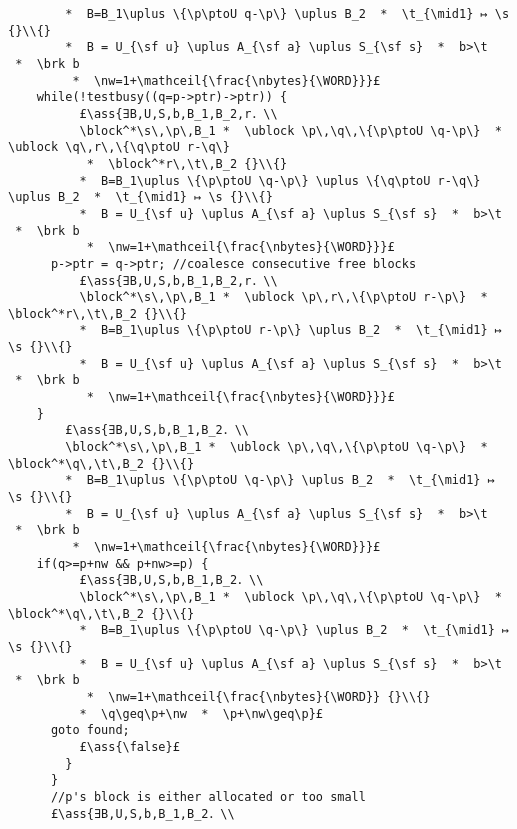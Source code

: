 \documentclass[12pt,a4paper]{article}
\makeatletter
\newcommand{\ml}[2][t]{\mbox{\mdseries\begin{tabular}[#1]{@{}L@{}}#2\end{tabular}}}
\newcommand{\ass}[1]{\ensuremath{{\color{blue}\left\{\ml[c]{#1}\right\}}}}
\makeatother
\begin{document}
\begin{lstlisting}
        *  B=B_1\uplus \{\p\ptoU q-\p\} \uplus B_2  *  \t_{\mid1} ↦ \s {}\\{}
        *  B = U_{\sf u} \uplus A_{\sf a} \uplus S_{\sf s}  *  b>\t  *  \brk b 
         *  \nw=1+\mathceil{\frac{\nbytes}{\WORD}}}£ 
	while(!testbusy((q=p->ptr)->ptr)) {
          £\ass{∃B,U,S,b,B_1,B_2,r．\\
          \block^*\s\,\p\,B_1 *  \ublock \p\,\q\,\{\p\ptoU \q-\p\}  *  \ublock \q\,r\,\{\q\ptoU r-\q\} 
           *  \block^*r\,\t\,B_2 {}\\{}
          *  B=B_1\uplus \{\p\ptoU \q-\p\} \uplus \{\q\ptoU r-\q\} \uplus B_2  *  \t_{\mid1} ↦ \s {}\\{}
          *  B = U_{\sf u} \uplus A_{\sf a} \uplus S_{\sf s}  *  b>\t  *  \brk b 
           *  \nw=1+\mathceil{\frac{\nbytes}{\WORD}}}£ 
	  p->ptr = q->ptr; //coalesce consecutive free blocks
          £\ass{∃B,U,S,b,B_1,B_2,r．\\
          \block^*\s\,\p\,B_1 *  \ublock \p\,r\,\{\p\ptoU r-\p\}  *  \block^*r\,\t\,B_2 {}\\{}
          *  B=B_1\uplus \{\p\ptoU r-\p\} \uplus B_2  *  \t_{\mid1} ↦ \s {}\\{}
          *  B = U_{\sf u} \uplus A_{\sf a} \uplus S_{\sf s}  *  b>\t  *  \brk b 
           *  \nw=1+\mathceil{\frac{\nbytes}{\WORD}}}£
	}
        £\ass{∃B,U,S,b,B_1,B_2．\\
        \block^*\s\,\p\,B_1 *  \ublock \p\,\q\,\{\p\ptoU \q-\p\}  *  \block^*\q\,\t\,B_2 {}\\{}
        *  B=B_1\uplus \{\p\ptoU \q-\p\} \uplus B_2  *  \t_{\mid1} ↦ \s {}\\{}
        *  B = U_{\sf u} \uplus A_{\sf a} \uplus S_{\sf s}  *  b>\t  *  \brk b 
         *  \nw=1+\mathceil{\frac{\nbytes}{\WORD}}}£ 
	if(q>=p+nw && p+nw>=p) {
          £\ass{∃B,U,S,b,B_1,B_2．\\
          \block^*\s\,\p\,B_1 *  \ublock \p\,\q\,\{\p\ptoU \q-\p\}  *  \block^*\q\,\t\,B_2 {}\\{}
          *  B=B_1\uplus \{\p\ptoU \q-\p\} \uplus B_2  *  \t_{\mid1} ↦ \s {}\\{}
          *  B = U_{\sf u} \uplus A_{\sf a} \uplus S_{\sf s}  *  b>\t  *  \brk b 
           *  \nw=1+\mathceil{\frac{\nbytes}{\WORD}} {}\\{}
          *  \q\geq\p+\nw  *  \p+\nw\geq\p}£ 
	  goto found;
          £\ass{\false}£
        } 
      }
      //p's block is either allocated or too small
      £\ass{∃B,U,S,b,B_1,B_2．\\

\end{lstlisting}
\end{document}

